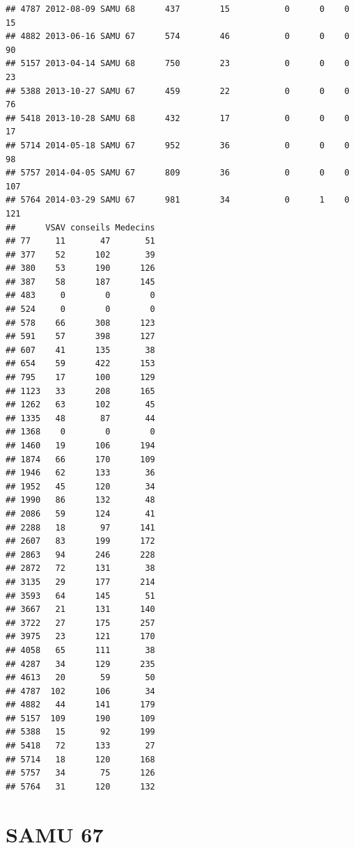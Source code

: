 \documentclass[]{article}
\newenvironment{Shaded}{\begin{snugshade}}{\end{snugshade}}
\newcommand{\CommentTok}[1]{\textcolor[rgb]{0.56,0.35,0.01}{\textit{{#1}}}}
\begin{document}
\begin{verbatim}
## 4787 2012-08-09 SAMU 68      437        15           0      0    0   15
## 4882 2013-06-16 SAMU 67      574        46           0      0    0   90
## 5157 2013-04-14 SAMU 68      750        23           0      0    0   23
## 5388 2013-10-27 SAMU 67      459        22           0      0    0   76
## 5418 2013-10-28 SAMU 68      432        17           0      0    0   17
## 5714 2014-05-18 SAMU 67      952        36           0      0    0   98
## 5757 2014-04-05 SAMU 67      809        36           0      0    0  107
## 5764 2014-03-29 SAMU 67      981        34           0      1    0  121
##      VSAV conseils Medecins
## 77     11       47       51
## 377    52      102       39
## 380    53      190      126
## 387    58      187      145
## 483     0        0        0
## 524     0        0        0
## 578    66      308      123
## 591    57      398      127
## 607    41      135       38
## 654    59      422      153
## 795    17      100      129
## 1123   33      208      165
## 1262   63      102       45
## 1335   48       87       44
## 1368    0        0        0
## 1460   19      106      194
## 1874   66      170      109
## 1946   62      133       36
## 1952   45      120       34
## 1990   86      132       48
## 2086   59      124       41
## 2288   18       97      141
## 2607   83      199      172
## 2863   94      246      228
## 2872   72      131       38
## 3135   29      177      214
## 3593   64      145       51
## 3667   21      131      140
## 3722   27      175      257
## 3975   23      121      170
## 4058   65      111       38
## 4287   34      129      235
## 4613   20       59       50
## 4787  102      106       34
## 4882   44      141      179
## 5157  109      190      109
## 5388   15       92      199
## 5418   72      133       27
## 5714   18      120      168
## 5757   34       75      126
## 5764   31      120      132
\end{verbatim}

\begin{Shaded}
\end{Shaded}

\section{SAMU 67}\label{samu-67}
\end{document}
